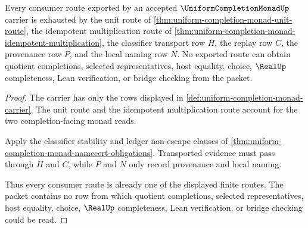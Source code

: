 \begin{theorem}\label{thm:uniform-completion-monad-ledger-nonescape}
Every consumer route exported by an accepted $\UniformCompletionMonadUp$ carrier is exhausted by the unit route of \autoref{thm:uniform-completion-monad-unit-route}, the idempotent multiplication route of \autoref{thm:uniform-completion-monad-idempotent-multiplication}, the classifier transport row $H$, the replay row $C$, the provenance row $P$, and the local naming row $N$. No exported route can obtain quotient completions, selected representatives, host equality, choice, $\RealUp$ completeness, Lean verification, or bridge checking from the packet.
\end{theorem}
\begin{proof}
The carrier has only the rows displayed in \autoref{def:uniform-completion-monad-carrier}. The unit route and the idempotent multiplication route account for the two completion-facing monad reads.

Apply the classifier stability and ledger non-escape clauses of \autoref{thm:uniform-completion-monad-namecert-obligations}. Transported evidence must pass through $H$ and $C$, while $P$ and $N$ only record provenance and local naming.

Thus every consumer route is already one of the displayed finite routes. The packet contains no row from which quotient completions, selected representatives, host equality, choice, $\RealUp$ completeness, Lean verification, or bridge checking could be read.
\end{proof}

\begin{closurestatus}{\UniformCompletionMonadUp}
  \theoryclosure{\seedClosure}
  \formalstatus{\unformalizedV}
\end{closurestatus}
